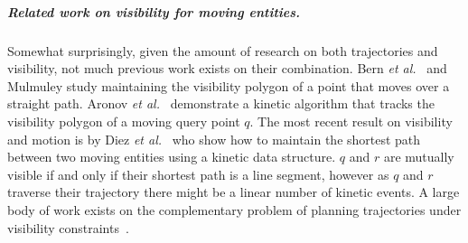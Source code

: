 \documentclass[UKenglish]{lipics-v2019}
\newcommand{\etal}{\textit{et al.}\xspace}
\begin{document}
\subparagraph {Related work on visibility for moving entities.}

Somewhat surprisingly, given the amount of research on both trajectories and visibility, not much previous work exists on their combination.
Bern \etal~\cite{bern1994visibility} and  Mulmuley \cite{mulmuley1991hidden} study maintaining the visibility polygon of a point that moves over a straight path. 
Aronov \etal~\cite{aronov2002visibility} demonstrate a kinetic algorithm that tracks the visibility polygon of a moving query point $q$. The most recent result on visibility and motion is by Diez \etal~\cite{DKRRS2017KineticAPSPEuroCG} who show how to maintain the shortest path between two moving entities using a kinetic data structure. $q$ and $r$ are mutually visible if and only if their shortest path is a line segment, however as $q$ and $r$ traverse their trajectory there might be a linear number of kinetic events. A large body of work exists on the complementary problem of planning trajectories under visibility constraints~\cite{6907405}.
\end{document}
